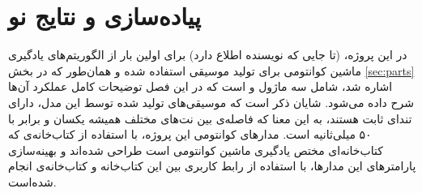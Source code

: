 \chapter{پیاده‌سازی و نتایج نو}

در این پروژه، (تا جایی که نویسنده اطلاع دارد) برای اولین بار از الگوریتم‌های یادگیری ماشین کوانتومی برای تولید موسیقی استفاده شده و همان‌طور که در بخش
\ref{sec:parts}
اشاره شد، شامل سه ماژول 
و
است که در این فصل توضیحات کامل عملکرد آن‌ها شرح داده می‌شود.
شایان ذکر است که موسیقی‌های تولید شده توسط این مدل، دارای تندای
ثابت هستند، به این معنا که فاصله‌ی بین نت‌های مختلف همیشه یکسان و برابر با ۵۰ میلی‌ثانیه است.
مدارهای کوانتومی این پروژه، با استفاده از کتاب‌خانه‌ی 
که کتاب‌خانه‌ای مختص یادگیری ماشین کوانتومی است طراحی شده‌اند و بهینه‌سازی پارامترهای این مدارها، با استفاده از رابط کاربری بین این کتاب‌خانه و کتاب‌خانه‌ی
انجام شده‌است.



